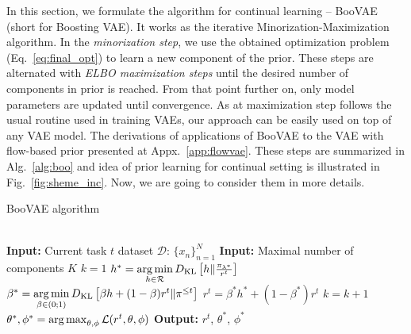 In this section, we formulate the algorithm for continual learning -- BooVAE (short for Boosting VAE).  It works as the iterative Minorization-Maximization algorithm. In the \textit{minorization step}, we use the obtained optimization problem (Eq.~\ref{eq:final_opt}) to learn a new component of the prior.
These steps are alternated with \textit{ELBO maximization steps} until the desired number of components in prior is reached. From that point further on, only model parameters are updated until convergence. As at maximization step follows the usual routine used in training VAEs, our approach can be easily used on top of any VAE model. The derivations of applications of BooVAE to the VAE with flow-based prior presented at Appx.~\ref{app:flowvae}. These steps are summarized in Alg.~\ref{alg:boo} and idea of prior learning for continual setting is illustrated in Fig.~\ref{fig:sheme_inc}. Now, we are going to consider them in more details.
\begin{algorithm}
	\caption{BooVAE algorithm}
	\label{alg:boo}
	\begin{algorithmic}
  \\\hrulefill
\State \hskip-3mm  {\bfseries Input:} { Current task $t$ dataset $\mathcal{D}: \,\{x_n\}_{n=1}^N$}
\State \hskip-3mm {\bfseries Input:} { Maximal number of components $K$}
		\State $k = 1$
		\State $h^* = \operatorname*{arg\,min}\limits_{h\in\mathcal{R}}D_{\mathrm{KL}}\left[h\| \frac{ \pi_{\lambda^*}}{r^{t}}\right]$
		\State $\beta^* = \operatorname*{arg\,min}\limits_{\beta\in(0;1)}D_{\mathrm{KL}}\left[\beta h + (1 - \beta) r^{t}\|\pi^{\leq t}\right]$
		\State $r^{t} = \beta^* h^* + (1 - \beta^*) r^{t} $
		\State $k = k + 1$
				\State $\theta^*, \phi^*  = \operatorname*{arg\,max}_{\theta,\phi} \mathcal{L}(r^{t}, \theta, \phi) $
		\EndWhile
            \State \hskip-3mm  {\bfseries Output:} $r^{t}$, $\theta^*$, $\phi^*$
	\end{algorithmic}
\end{algorithm}
